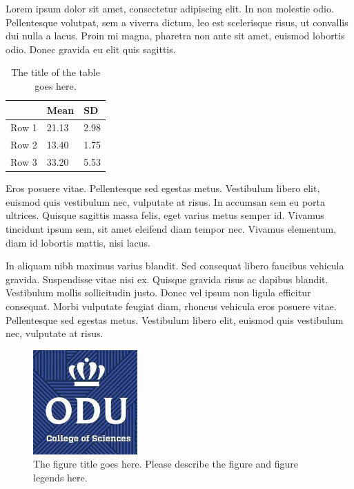 Lorem ipsum dolor sit amet, consectetur adipiscing elit. In non molestie odio. Pellentesque volutpat, sem a viverra dictum, leo est scelerisque risus, ut convallis dui nulla a lacus. Proin mi magna, pharetra non ante sit amet, euismod lobortis odio. Donec gravida eu elit quis sagittis. 

\begin{table}[tbh]
\caption[The title of the table goes here.]{The title of the table goes here.}
\label{tab:table_example1_1}
\begin{center}
\begin{tabular}{lll}
      & Mean  & SD   \\ \hline
Row 1 & 21.13 & 2.98 \\ 
Row 2 & 13.40 & 1.75 \\ 
Row 3 & 33.20 & 5.53 \\ \hline
\end{tabular}
\end{center}
\end{table}

Eros posuere vitae. Pellentesque sed egestas metus. Vestibulum libero elit, euismod quis vestibulum nec, vulputate at risus. In accumsan sem eu porta ultrices. Quisque sagittis massa felis, eget varius metus semper id. Vivamus tincidunt ipsum sem, sit amet eleifend diam tempor nec. Vivamus elementum, diam id lobortis mattis, nisi lacus.

In aliquam nibh maximus varius blandit. Sed consequat libero faucibus vehicula gravida. Suspendisse vitae nisi ex. Quisque gravida risus ac dapibus blandit. Vestibulum mollis sollicitudin justo. Donec vel ipsum non ligula efficitur consequat. Morbi vulputate feugiat diam, rhoncus vehicula eros posuere vitae. Pellentesque sed egestas metus. Vestibulum libero elit, euismod quis vestibulum nec, vulputate at risus. 

\begin{figure}[tbh]
  \centering
  \includegraphics[height=4cm]{Figures/cos1.jpeg}
  \caption[The figure title goes here.]{The figure title goes here. Please describe the figure and figure legends here.}
  \label{fig:cos1_6}
\end{figure}

